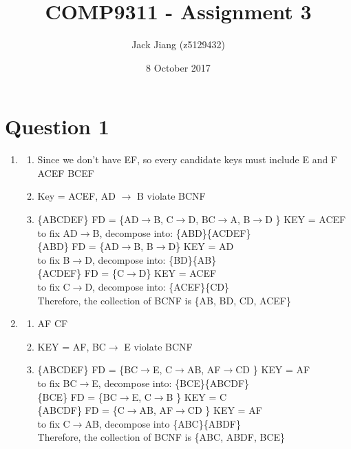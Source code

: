 \documentclass[11pt, a4paper]{article}
\begin{document}
\title{COMP9311 - Assignment 3}
\author{Jack Jiang (z5129432)}
\date{ 8 October 2017 }
\maketitle
\graphicspath{{/}}


\section*{Question 1}
\renewcommand{\labelenumi}{\roman{enumi}. }
\begin{enumerate}
    \item    
        \begin{enumerate}
            \item 
                Since we don't have EF, so every candidate keys must include E and F
                ACEF
                BCEF
            \item
                Key = ACEF, AD $\to$ B violate BCNF
            \item 
                \{ABCDEF\} FD = \{AD$\to$B, C$\to$D, BC$\to$A, B$\to$D \} KEY = ACEF\\
                to fix AD$\to$B, decompose into: \{ABD\}\{ACDEF\}\\
                \{ABD\} FD = \{AD$\to$B, B$\to$D\} KEY = AD\\
                to fix B$\to$D, decompose into: \{BD\}\{AB\}\\
                \{ACDEF\} FD = \{C$\to$D\} KEY = ACEF\\
                to fix C$\to$D, decompose into: \{ACEF\}\{CD\}\\
                Therefore, the collection of BCNF is \{AB, BD, CD, ACEF\}
        \end{enumerate}

    \item    
        \begin{enumerate}
            \item 
                AF
                CF
            \item
                KEY = AF, BC$\to$ E violate BCNF
            \item 
            \{ABCDEF\} FD = \{BC$\to$E, C$\to$AB, AF$\to$CD \} KEY = AF\\
            to fix BC$\to$E, decompose into: \{BCE\}\{ABCDF\}\\
            \{BCE\} FD = \{BC$\to$E, C$\to$B \} KEY = C\\
            \{ABCDF\} FD = \{C$\to$AB, AF$\to$CD \} KEY = AF\\
            to fix C$\to$AB, decompose into \{ABC\}\{ABDF\}\\
            Therefore, the collection of BCNF is \{ABC, ABDF, BCE\}
        \end{enumerate}


\end{enumerate}
\end{document}
